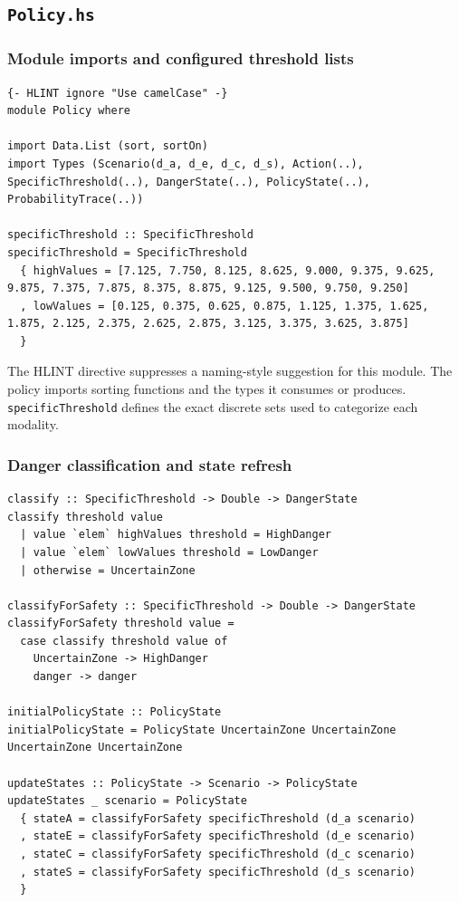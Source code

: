 \documentclass[11pt]{article}
\begin{document}
\subsection{\texttt{Policy.hs}}

\subsubsection{Module imports and configured threshold lists}

\begin{lstlisting}
{- HLINT ignore "Use camelCase" -}
module Policy where

import Data.List (sort, sortOn)
import Types (Scenario(d_a, d_e, d_c, d_s), Action(..), SpecificThreshold(..), DangerState(..), PolicyState(..), ProbabilityTrace(..))

specificThreshold :: SpecificThreshold
specificThreshold = SpecificThreshold
  { highValues = [7.125, 7.750, 8.125, 8.625, 9.000, 9.375, 9.625, 9.875, 7.375, 7.875, 8.375, 8.875, 9.125, 9.500, 9.750, 9.250]
  , lowValues = [0.125, 0.375, 0.625, 0.875, 1.125, 1.375, 1.625, 1.875, 2.125, 2.375, 2.625, 2.875, 3.125, 3.375, 3.625, 3.875]
  }
\end{lstlisting}

The HLINT directive suppresses a naming-style suggestion for this module.
The policy imports sorting functions and the types it consumes or produces.
\texttt{specificThreshold} defines the exact discrete sets used to categorize
each modality.

\subsubsection{Danger classification and state refresh}

\begin{lstlisting}
classify :: SpecificThreshold -> Double -> DangerState
classify threshold value
  | value `elem` highValues threshold = HighDanger
  | value `elem` lowValues threshold = LowDanger
  | otherwise = UncertainZone

classifyForSafety :: SpecificThreshold -> Double -> DangerState
classifyForSafety threshold value =
  case classify threshold value of
    UncertainZone -> HighDanger
    danger -> danger

initialPolicyState :: PolicyState
initialPolicyState = PolicyState UncertainZone UncertainZone UncertainZone UncertainZone

updateStates :: PolicyState -> Scenario -> PolicyState
updateStates _ scenario = PolicyState
  { stateA = classifyForSafety specificThreshold (d_a scenario)
  , stateE = classifyForSafety specificThreshold (d_e scenario)
  , stateC = classifyForSafety specificThreshold (d_c scenario)
  , stateS = classifyForSafety specificThreshold (d_s scenario)
  }
\end{lstlisting}
\end{document}
